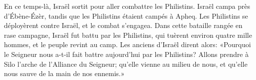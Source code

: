 En ce temps-là, Israël sortit pour aller combattre les Philistins.
	Israël campa près d’Ébène-Ézèr, tandis que les Philistins étaient campés à Apheq.
Les Philistins se déployèrent contre Israël, et le combat s’engagea.
Dans cette bataille rangée en rase campagne,
	Israël fut battu par les Philistins, qui tuèrent environ quatre mille hommes,
	et le peuple revint au camp.
Les anciens d’Israël dirent alors:
	«Pourquoi le Seigneur nous a-t-il fait battre aujourd’hui par les Philistins?
	Allons prendre à Silo l’arche de l’Alliance du Seigneur;
	qu’elle vienne au milieu de nous, et qu’elle nous sauve de la main de nos ennemis.»
